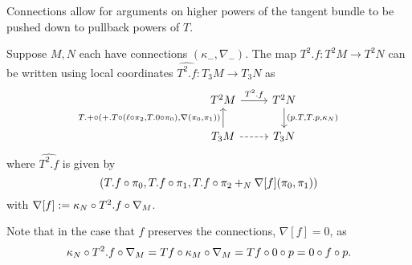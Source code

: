 \begin{example}
\begin{enumerate}[(i)]
    \end{enumerate}
\end{example}

Connections allow for arguments on higher powers of the tangent bundle to be pushed down to pullback powers of $T$.
\begin{observation}
    Suppose $M, N$ each have connections $(\kappa_{-}, \nabla_{-})$. 
    The map $T^2.f: T^2M \to T^2N$ can be written using local coordinates $\widehat{T^2.f}: T_3M \to T_3N$ as
    \[\begin{tikzcd}
        {T^2M} & {T^2N} \\
        {T_3M} & {T_3N}
        \arrow["{T.+ \o (+.T \o (\ell \o \pi_2, T.0 \o \pi_0), \nabla(\pi_0, \pi_1))}", from=2-1, to=1-1]
        \arrow["{T^2.f}", from=1-1, to=1-2]
        \arrow["{(p.T, T.p, \kappa_N)}", from=1-2, to=2-2]
        \arrow[dashed, from=2-1, to=2-2]
    \end{tikzcd}\]
    where $\widehat{T^2.f}$ is given by
    \[
        (T.f\circ\pi_0, T.f \circ\pi_1, T.f \circ \pi_2 +_N \nabla[f](\pi_0,\pi_1))
    \]
    with $\nabla[f] := \kappa_N \circ T^2.f \circ \nabla_M$.
\end{observation}
Note that in the case that $f$ preserves the connections, $\nabla[f] = 0$, as 
\[
    \kappa_N \circ T^2.f \circ \nabla_M = Tf \circ \kappa_M \circ \nabla_M = Tf \circ 0 \circ p = 0 \circ f \circ p.
\]

